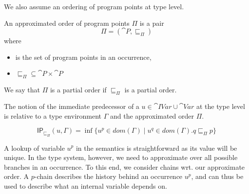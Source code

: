 \documentclass{llncs}
\newcommand{\sqleq}{\ensuremath{\sqsubseteq\xspace}}
\newcommand{\IP}{\ensuremath{\textsf{IP}}\xspace}
\begin{document}
We also assume an ordering of program points at type level.

\begin{definition}
	An approximated order of program points $\Pi$ is a pair
	\[ \Pi=(\cat{P},\sqleq_\Pi) \]
	where
	\begin{itemize}
		\item {} is the set of program points in an occurrence,
		\item $\sqleq_\Pi\subseteq\cat{P}\times\cat{P}$
	\end{itemize}
	We say that $\Pi$ is a partial order if $\sqleq_\Pi$ is a partial order.
\end{definition}

The notion of the immediate predecessor of a $u\in\cat{IVar} \cup \cat{Var}$ at the type level is relative to a type environment $\Gamma$ and the approximated order $\Pi$.

\begin{definition}\label{def:GBindPi}
	\[ \IP_{\sqleq_\Pi}(u,\Gamma)=\inf\{u^p\in
          dom(\Gamma)\mid u^q\in dom(\Gamma).q\sqleq_\Pi p\} \]
\end{definition}

A lookup of variable $u^p$ in the semantics is straightforward as its
value will be unique. In the type system, however, we need to
approximate over all possible branches in an occurrence.  To this end,
we consider chains wrt. our approximate order.  A $p$-chain describes
the history behind an occurrence $u^p$, and can thus be used to
describe what an internal variable depends on.


\end{document}
